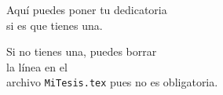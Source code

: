 
\thispagestyle{empty}
\vspace*{17mm}

\begin{flushright}
\begin{itshape}

Aquí puedes poner tu dedicatoria\\
si es que tienes una.\bigskip\bigskip

Si no tienes una, puedes borrar\\
la línea \verb++ en el\\
archivo \texttt{MiTesis.tex} pues no es obligatoria.

\end{itshape}
\end{flushright}

